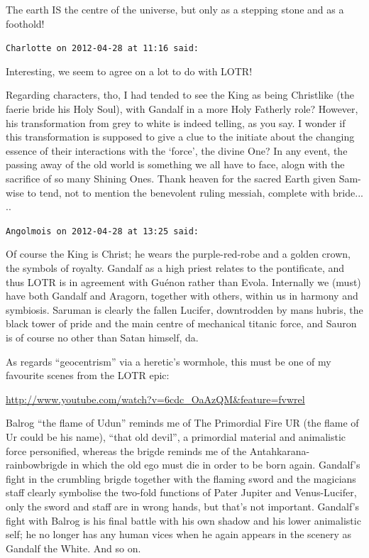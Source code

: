 \begin{footnotesize}
\begin{sffamily}
The earth IS the centre of the universe, but only as a stepping stone and as a foothold!

\hfill

\texttt{Charlotte on 2012-04-28 at 11:16 said:}

Interesting, we seem to agree on a lot to do with LOTR!

Regarding characters, tho, I had tended to see the King as being Christlike (the faerie bride his Holy Soul), with Gandalf in a more Holy Fatherly role? However, his transformation from grey to white is indeed telling, as you say. I wonder if this transformation is supposed to give a clue to the initiate about the changing essence of their interactions with the `force', the divine One? In any event, the passing away of the old world is something we all have to face, alogn with the sacrifice of so many Shining Ones. Thank heaven for the sacred Earth given Sam-wise to tend, not to mention the benevolent ruling messiah, complete with bride... ..

\hfill

\texttt{Angolmois on 2012-04-28 at 13:25 said:}

Of course the King is Christ; he wears the purple-red-robe and a golden crown, the symbols of royalty. Gandalf as a high priest relates to the pontificate, and thus LOTR is in agreement with Guénon rather than Evola. Internally we (must) have both Gandalf and Aragorn, together with others, within us in harmony and symbiosis. Saruman is clearly the fallen Lucifer, downtrodden by mans hubris, the black tower of pride and the main centre of mechanical titanic force, and Sauron is of course no other than Satan himself, da.

As regards ``geocentrism'' via a heretic's wormhole, this must be one of my favourite scenes from the LOTR epic:

\url{http://www.youtube.com/watch?v=6cdc_OaAzQM&feature=fvwrel}


Balrog ``the flame of Udun'' reminds me of The Primordial Fire UR (the flame of Ur could be his name), ``that old devil'', a primordial material and animalistic force personified, whereas the brigde reminds me of the Antahkarana-rainbowbrigde in which the old ego must die in order to be born again. Gandalf's fight in the crumbling brigde together with the flaming sword and the magicians staff clearly symbolise the two-fold functions of Pater Jupiter and Venus-Lucifer, only the sword and staff are in wrong hands, but that's not important. Gandalf's fight with Balrog is his final battle with his own shadow and his lower animalistic self; he no longer has any human vices when he again appears in the scenery as Gandalf the White. And so on.


\end{sffamily}
\end{footnotesize}
